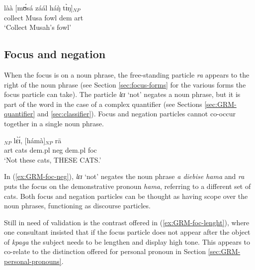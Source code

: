 \begin{exe}
\begin{exe}
\begin{exe}
{\begin{exe}
\begin{exe}
\begin{exe}
\begin{exe}
\begin{exe}
\begin{exe}
\begin{exe}
\begin{xlist}
\begin{exe}
\begin{exe}
\begin{exe}
\begin{exe}
\begin{exe}
   \ex\label{ex:GRM-dem-art}
 \gll làà [mʊ́sá záál háŋ̀ tɪ̀ŋ]$_{NP}$\\
 collect Musa fowl  {\sc dem} {\sc art}\\
 \glt `Collect  Musah's  fowl'  


 
\z 
 \z




\subsection{Focus and negation}
\label{sec:GRM-foc-neg}

When the focus is on a noun phrase, the free-standing particle {\it ra} appears
to the right of the noun phrase (see Section \ref{sec:focus-forms} for the
various forms the focus particle can take). The particle {\it lɛɪ} `not'  
negates
a noun phrase, but it is part of the word in the case of a complex quantifier
(see Sections \ref{sec:GRM-quantifier}  and  \ref{sec:classifier}). Focus and
negation particles cannot co-occur together in a single noun phrase.  

\begin{exe}
 \ex\label{ex:GRM-foc-neg} 
 
 \gll [à dìèbísè hámà]$_{NP}$ lɛ̀ɪ́, [hámà]$_{NP}$ rā\\
  {\sc art} cats {\sc dem.pl} {\sc neg}  {\sc dem.pl} {\sc foc}\\
 \glt   `Not these cats, THESE CATS.'
\z

In  (\ref{ex:GRM-foc-neg}), {\it lɛɪ} `not' negates the noun phrase {\it a 
diebise
hama} and {\it ra} puts the focus on the demonstrative pronoun {\it hama},
referring to a different set of cats.  Both focus and negation particles can be
thought as having scope over the noun phrases, functioning as discourse 
particles. 

 Still in need of validation is the contrast offered in 
(\ref{ex:GRM-foc-lenght}),  where one consultant insisted that if the focus 
particle does not appear after the object of {\it kpaga} the subject needs to 
be 
lengthen and display high tone. This appears to co-relate to the distinction 
offered for personal pronoun in Section \ref{sec:GRM-personal-pronouns}.




\end{exe}
\end{exe}
\end{exe}
\end{exe}
\end{exe}
\end{exe}
\end{xlist}
\end{exe}
\end{exe}
\end{exe}
\end{exe}
\end{exe}
\end{exe}
\end{exe}}
\end{exe}
\end{exe}
\end{exe}
